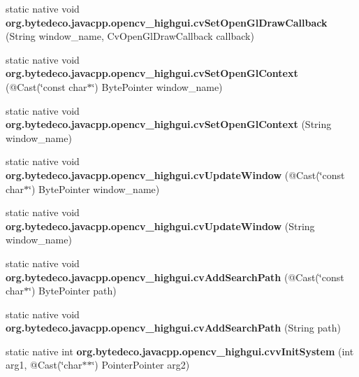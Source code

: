 \begin{DoxyCompactItemize}
static native void {\bfseries org.\+bytedeco.\+javacpp.\+opencv\+\_\+highgui.\+cv\+Set\+Open\+Gl\+Draw\+Callback} (String window\+\_\+name, Cv\+Open\+Gl\+Draw\+Callback callback)
\item 
\mbox{\label{group__highgui__c_ga9996b90f35a2dcc9da7d9208f4de0e3f}} 
static native void {\bfseries org.\+bytedeco.\+javacpp.\+opencv\+\_\+highgui.\+cv\+Set\+Open\+Gl\+Context} (@Cast(\char`\"{}const char$\ast$\char`\"{}) Byte\+Pointer window\+\_\+name)
\item 
\mbox{\label{group__highgui__c_ga63ae73e415e9ea8bb138efd05dfc4daf}} 
static native void {\bfseries org.\+bytedeco.\+javacpp.\+opencv\+\_\+highgui.\+cv\+Set\+Open\+Gl\+Context} (String window\+\_\+name)
\item 
\mbox{\label{group__highgui__c_gac7d59cf01d3c273fce09f53b52f3853c}} 
static native void {\bfseries org.\+bytedeco.\+javacpp.\+opencv\+\_\+highgui.\+cv\+Update\+Window} (@Cast(\char`\"{}const char$\ast$\char`\"{}) Byte\+Pointer window\+\_\+name)
\item 
\mbox{\label{group__highgui__c_ga8de10c5cad881abe34227ae5691569a6}} 
static native void {\bfseries org.\+bytedeco.\+javacpp.\+opencv\+\_\+highgui.\+cv\+Update\+Window} (String window\+\_\+name)
\item 
\mbox{\label{group__highgui__c_ga24fd0d75a28698851eb08c56432c7936}} 
static native void {\bfseries org.\+bytedeco.\+javacpp.\+opencv\+\_\+highgui.\+cv\+Add\+Search\+Path} (@Cast(\char`\"{}const char$\ast$\char`\"{}) Byte\+Pointer path)
\item 
\mbox{\label{group__highgui__c_ga28ab4d8c37cda91da34770e0aa5ea6b8}} 
static native void {\bfseries org.\+bytedeco.\+javacpp.\+opencv\+\_\+highgui.\+cv\+Add\+Search\+Path} (String path)
\item 
\mbox{\label{group__highgui__c_gaf53efec8b9dc2524d6d10703d32f79fc}} 
static native int {\bfseries org.\+bytedeco.\+javacpp.\+opencv\+\_\+highgui.\+cvv\+Init\+System} (int arg1, @Cast(\char`\"{}char$\ast$$\ast$\char`\"{}) Pointer\+Pointer arg2)
\item 
\mbox{\label{group__highgui__c_ga887a7a5dbcd38b9a45ae609fb09dcdad}} 
$$
\end{DoxyCompactItemize}
